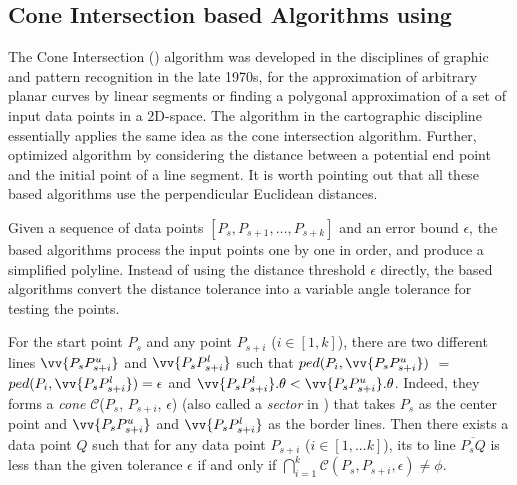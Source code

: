 \subsection{Cone Intersection based Algorithms using \ped}
\label{sub-ci-ped}


The Cone Intersection (\cia) algorithm \cite{Williams:Longest, Sklansky:Cone} was developed in the disciplines of graphic and pattern recognition in the late 1970s, for the approximation of arbitrary planar curves by linear segments or finding a polygonal approximation of a set of input data points in a 2D-space. The \sleeve algorithm \cite{Zhao:Sleeve} in the cartographic discipline essentially applies the same idea as the cone intersection algorithm.
Further, \cite{Dunham:Cone}  optimized algorithm \cia by considering the distance between a potential end point and the initial point of a line segment. It is worth pointing out that all these \cia based algorithms use the perpendicular Euclidean distances.


Given a sequence of data points $[P_{s}, P_{s+1}, \ldots, P_{s+k}]$ and an error bound $\epsilon$, the \cia based algorithms process the input points one by one in order, and produce a simplified polyline.  Instead of using the distance threshold $\epsilon$ directly, the \cia based algorithms convert the distance tolerance into a variable angle tolerance for testing the points.

For the start point $P_s$ and any point $P_{s+i}$ ($i\in[1, k]$), there are two different lines $\vv{P_sP^u_{s+i}}$ and $\vv{P_sP^l_{s+i}}$ such that $ped(P_i, \vv{P_sP^u_{s+i}})$ $=$ $ped(P_i, \vv{P_sP^l_{s+i}}) = \epsilon$ and $\vv{P_sP^l_{s+i}}.\theta < \vv{P_sP^u_{s+i}}.\theta$. Indeed, they forms a \emph{cone} $\mathcal{C}$($P_s$, $P_{s+i}$, $\epsilon$) (also called a \emph{sector} in \sleeve \cite{Zhao:Sleeve}) that takes $P_s$ as the center point and $\vv{P_sP^u_{s+i}}$ and $\vv{P_sP^l_{s+i}}$ as the border lines.
Then there exists a data point $Q$ such that for any data point $P_{s+i}$ ($i \in [1, ... k]$), its \ped to
line $\overline{P_sQ}$ is less than the given \ped tolerance $\epsilon$ if and only if $\bigcap_{i=1}^{k}\mathcal{C}(P_s, P_{s+i}, \epsilon) \ne \phi$.


